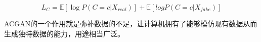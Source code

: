 \begin{equation}
\label{equ:equ_acgan_c}
L_C = \mathbb{E}[\log P(C = c | X_{real})] + \mathbb{E}[logP(C = c | X_{fake})]
\end{equation}

ACGAN的一个作用就是弥补数据的不足，让计算机拥有了能够模仿现有数据从而生成独特数据的能力，用途相当广泛。













